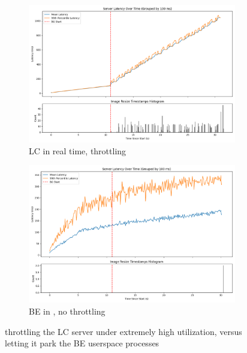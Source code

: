 \begin{figure}[t]
    \centering
    \begin{subfigure}[t]{0.49\columnwidth}
        \includegraphics[width=\columnwidth]{graphs/overload-rt.png}
        \caption{LC in real time, throttling}\label{fig:overload-rt}
    \end{subfigure}
    \hspace{\fill}
    \begin{subfigure}[t]{0.49\columnwidth}
        \includegraphics[width=\columnwidth]{graphs/overload-schedbe.png}
        \caption{BE in \schedbe{}, no throttling}\label{fig:overload-schedbe}
    \end{subfigure}
    \vspace{4pt}
    \caption{throttling the LC server under extremely high utilization, versus
    letting it park the BE userspace processes}
\end{figure}

